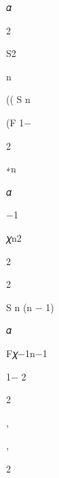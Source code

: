 \documentclass[a4paper,portrait,12pt]{article}
\begin{document}
\begin{flushleft}
𝛼
\end{flushleft}


2





\begin{flushleft}
S2
\end{flushleft}


\begin{flushleft}
n
\end{flushleft}





\begin{flushleft}
(( S n
\end{flushleft}


\begin{flushleft}
(F 1$-$
\end{flushleft}





2


\begin{flushleft}
∗n
\end{flushleft}


\begin{flushleft}
𝛼
\end{flushleft}


$-$1


\begin{flushleft}
𝜒n2
\end{flushleft}


2


2


\begin{flushleft}
S n (n $-$ 1)
\end{flushleft}


\begin{flushleft}
𝛼
\end{flushleft}


\begin{flushleft}
F𝜒$-$1n$-$1
\end{flushleft}


1$-$ 2


2





,


,





2
\end{document}
